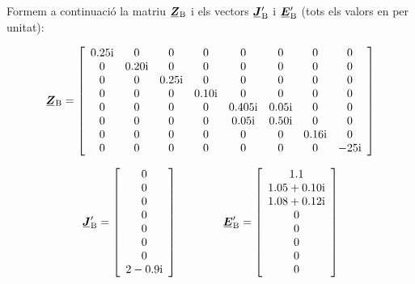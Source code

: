 \begin{exemple}
    Formem a continuació la matriu $\mcmplx{Z}\ped{B}$ i els vectors $\mcmplx{J}\ped{B}'$ i $\mcmplx{E}\ped{B}'$ (tots els valors en per unitat):

    \[
       \mcmplx{Z}\ped{B} =
       \begin{bmatrix}\begin{array}{cccccccc}
         \complexnum{j 0,25} & 0 & 0 & 0 & 0 & 0 & 0 & 0 \\
         0 & \complexnum{j 0,20} & 0 & 0 & 0 & 0 & 0 & 0 \\
         0 & 0 & \complexnum{j 0,25} & 0 & 0 & 0 & 0 & 0 \\
         0 & 0 & 0 & \complexnum{j 0,10} & 0 & 0 & 0 & 0 \\
         0 & 0 & 0 & 0 & \complexnum{j 0,405} & \complexnum{j 0,05} & 0 & 0 \\
         0 & 0 & 0 & 0 & \complexnum{j 0,05} & \complexnum{j 0,50} & 0 & 0 \\
         0 & 0 & 0 & 0 & 0 & 0 & \complexnum{j 0,16} & 0 \\
         0 & 0 & 0 & 0 & 0 & 0 & 0 & \complexnum{-j 25}
       \end{array}\end{bmatrix}
    \]

    \[
       \mcmplx{J}\ped{B}' =
       \begin{bmatrix}\begin{array}{c}
        0 \\
        0 \\
        0 \\
        0 \\
        0 \\
        0 \\
        0 \\
        \complexnum{2 - j 0,9}
       \end{array}\end{bmatrix}
       \qquad \qquad
       \mcmplx{E}\ped{B}' =
       \begin{bmatrix}\begin{array}{c}
        \num{1,1} \\
        \complexnum{1,05 + j 0,10} \\
        \complexnum{1,08 + j 0,12} \\
        0 \\
        0 \\
        0 \\
        0 \\
        0
      \end{array}\end{bmatrix}
    \]


\end{exemple}
